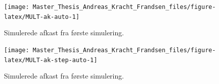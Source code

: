 \documentclass[
  a4paper,
  oneside]{memoir}
\begin{document}
\begin{table}[!h]
\begin{threeparttable}
\begin{tablenotes}
\end{tablenotes}
\end{threeparttable}
\end{table}

\begin{figure}[htbp!]

{\centering \texttt{[image: Master\_Thesis\_Andreas\_Kracht\_Frandsen\_files/figure-latex/MULT-ak-auto-1]} 

}

\caption{Simulerede afkast fra første simulering.}\label{fig:MULT-ak-auto}
\end{figure}

\begin{figure}[htbp!]

{\centering \texttt{[image: Master\_Thesis\_Andreas\_Kracht\_Frandsen\_files/figure-latex/MULT-ak-step-auto-1]} 

}

\caption{Simulerede afkast fra første simulering.}\label{fig:MULT-ak-step-auto}
\end{figure}
\end{document}
